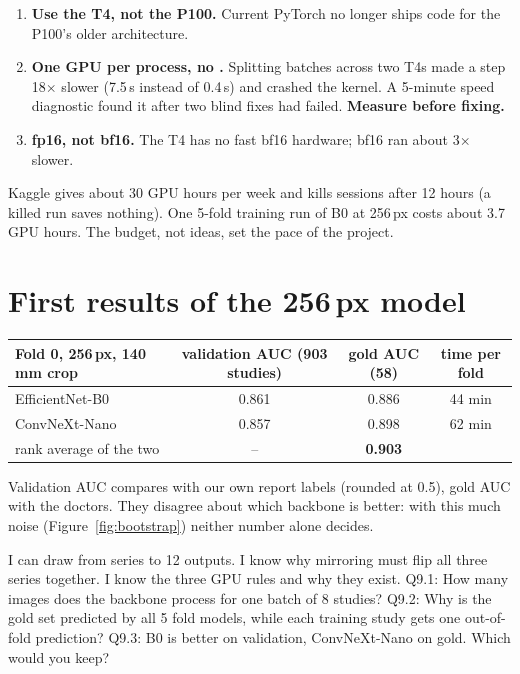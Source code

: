 \begin{watchout}
\begin{enumerate}
\item \textbf{Use the T4, not the P100.} Current PyTorch no longer ships code for the P100's older architecture.
\item \textbf{One GPU per process, no .} Splitting batches across two T4s made a step 18$\times$
      slower (7.5\,s instead of 0.4\,s) and crashed the kernel. A 5-minute speed diagnostic found it after two blind
      fixes had failed. \textbf{Measure before fixing.}
\item \textbf{fp16, not bf16.} The T4 has no fast bf16 hardware; bf16 ran about 3$\times$ slower.
\end{enumerate}
\end{watchout}

\begin{innumbers}
Kaggle gives about 30 GPU hours per week and kills sessions after 12 hours (a killed run saves nothing). One
5-fold training run of B0 at 256\,px costs about 3.7 GPU hours. The budget, not ideas, set the pace of the project.
\end{innumbers}

\section{First results of the 256\,px model}

\begin{center}\small
\begin{tabular}{lccc}
\toprule
Fold 0, 256\,px, 140\,mm crop & validation AUC (903 studies) & gold AUC (58) & time per fold \\
\midrule
EfficientNet-B0 & 0.861 & 0.886 & 44 min \\
ConvNeXt-Nano & 0.857 & 0.898 & 62 min \\
rank average of the two & -- & \textbf{0.903} & \\
\bottomrule
\end{tabular}
\end{center}

Validation AUC compares with our own report labels (rounded at 0.5), gold AUC with the doctors. They disagree about
which backbone is better: with this much noise (Figure~\ref{fig:bootstrap}) neither number alone decides.

\begin{checkpoint}
\begin{itemize}
\done I can draw  from series to 12 outputs.
\done I know why mirroring must flip all three series together.
\done I know the three GPU rules and why they exist.
\quiz Q9.1: How many images does the backbone process for one batch of 8 studies?
\quiz Q9.2: Why is the gold set predicted by all 5 fold models, while each training study gets one out-of-fold
      prediction?
\quiz Q9.3: B0 is better on validation, ConvNeXt-Nano on gold. Which would you keep?
\end{itemize}
\end{checkpoint}
